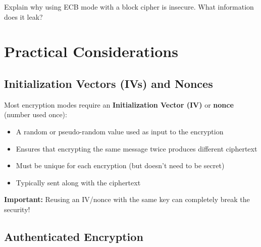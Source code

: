 \documentclass[11pt,a4paper]{report}
\begin{document}
\begin{ex}
Explain why using ECB mode with a block cipher is insecure. What information does it leak?
\end{ex}

\newpage
\section{Practical Considerations}

\subsection{Initialization Vectors (IVs) and Nonces}

Most encryption modes require an \textbf{Initialization Vector (IV)} or \textbf{nonce} (number used once):
\begin{itemize}
\item A random or pseudo-random value used as input to the encryption
\item Ensures that encrypting the same message twice produces different ciphertext
\item Must be unique for each encryption (but doesn't need to be secret)
\item Typically sent along with the ciphertext
\end{itemize}

\textbf{Important:} Reusing an IV/nonce with the same key can completely break the security!

\subsection{Authenticated Encryption}
\end{document}
